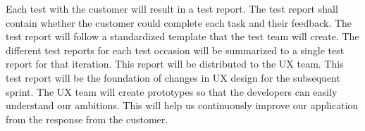 \noindent Each test with the customer will result in a test report. The test report shall contain whether the customer could complete each task and their feedback. The test report will follow a standardized template that the test team will create. The different test reports for each test occasion will be summarized to a single test report for that iteration. This report will be distributed to the UX team. This test report will be the foundation of changes in UX design for the subsequent sprint. The UX team will create prototypes so that the developers can easily understand our ambitions. This will help us continuously improve our application from the response from the customer.\newline

